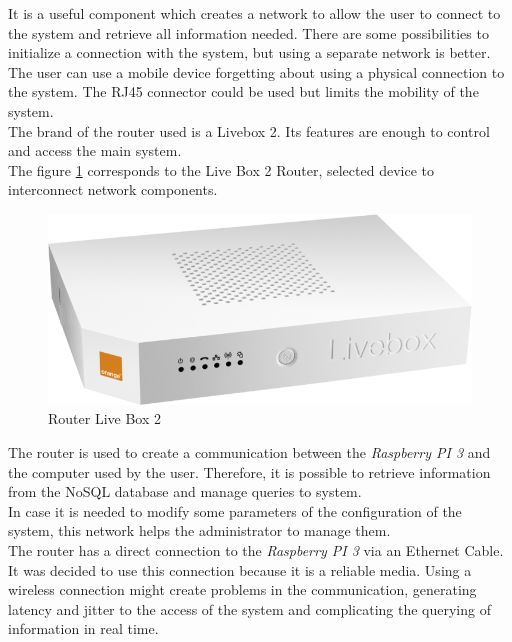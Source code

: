 It is a useful component which creates a network to allow the user to connect to the system and retrieve all information needed. There are some possibilities to initialize a connection with the system, but using a separate network is better. The user can use a mobile device forgetting about using a physical connection to the system. The RJ45 connector could be used but limits the mobility of the system.\\

The brand of the router used is a Livebox 2. Its features are enough to control and access the main system.\\

The figure \ref{Live_Box2} corresponds to the Live Box 2 Router, selected device to interconnect network components.

\begin{figure}[H]
\begin{centering}
\includegraphics[scale=0.3]{IMGS/LIVE_BOX_2.png}
\caption{Router Live Box 2 \label{Live_Box2}}
\end{centering}
\end{figure}

The router is used to create a communication between the \textit{Raspberry PI 3} and the computer used by the user. Therefore, it is possible to retrieve information from the NoSQL database and manage queries to system.\\

In case it is needed to modify some parameters of the configuration of the system, this network helps the administrator to manage them.\\

The router has a direct connection to the \textit{Raspberry PI 3} via an Ethernet Cable. It was decided to use this connection because it is a reliable media. Using a wireless connection might create problems in the communication, generating latency and jitter to the access of the system and complicating the querying of information in real time.

